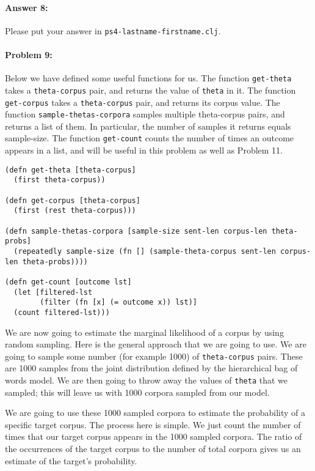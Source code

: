 \documentclass[10pt]{article}
\newcommand{\PSnum}{4}
\begin{document}
\paragraph{Answer 8:} Please put your answer in
\texttt{ps\PSnum-lastname-firstname.clj}.

\hrulefill %

\paragraph{Problem 9:}

Below we have defined some useful functions for us. The function
\texttt{get-theta} takes a \texttt{theta-corpus} pair, and returns the
value of \texttt{theta} in it. The function \texttt{get-corpus} takes
a \texttt{theta-corpus} pair, and returns its corpus value. The
function \texttt{sample-thetas-corpora} samples multiple theta-corpus
pairs, and returns a list of them. In particular, the number of
samples it returns equals sample-size.  The function \texttt{get-count}
counts the number of times an outcome appears in a list, and will be
useful in this problem as well as Problem 11.

\begin{lstlisting}
(defn get-theta [theta-corpus]
  (first theta-corpus))

(defn get-corpus [theta-corpus]
  (first (rest theta-corpus)))
  
(defn sample-thetas-corpora [sample-size sent-len corpus-len theta-probs]
  (repeatedly sample-size (fn [] (sample-theta-corpus sent-len corpus-len theta-probs))))

(defn get-count [outcome lst]
  (let [filtered-lst 
        (filter (fn [x] (= outcome x)) lst)]
  (count filtered-lst)))
\end{lstlisting}

 We are now going to estimate the marginal likelihood of a
corpus by using random sampling. Here is the general approach that we
are going to use. We are going to sample some number (for example
1000) of \texttt{theta-corpus} pairs. These are 1000 samples from the
joint distribution defined by the hierarchical bag of words model. We
are then going to throw away the values of \texttt{theta} that we
sampled; this will leave us with 1000 corpora sampled from our model.

We are going to use these 1000 sampled corpora to estimate
the probability of a specific target corpus. The process here is
simple. We just count the number of times that our target corpus
appears in the 1000 sampled corpora. The ratio of the occurrences of
the target corpus to the number of total corpora gives us an estimate
of the target's probability.
\end{document}
